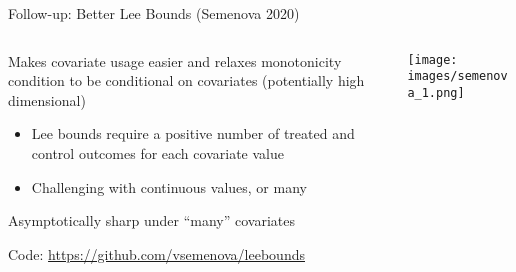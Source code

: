 \documentclass[notes,11pt, aspectratio=169]{beamer}
\newenvironment{wideitemize}{\itemize\addtolength{\itemsep}{10pt}}{\enditemize}
\begin{document}
\begin{frame}{Follow-up: Better Lee Bounds (Semenova 2020)}
      \begin{columns}[onlytextwidth, T] %
        \begin{column}{.5\textwidth}
          \begin{wideitemize}
          \item Makes covariate usage easier and relaxes monotonicity condition to be conditional on
            covariates (potentially high dimensional)
            \begin{itemize}
            \item Lee bounds require a positive number of treated and
              control outcomes for each covariate value
            \item Challenging with continuous values, or many
            \end{itemize}
          \item Asymptotically sharp under ``many'' covariates 
          \item Code: \url{https://github.com/vsemenova/leebounds}
          \end{wideitemize}
      \end{column}%
      \hfill%
      \begin{column}{.5\textwidth}
        \texttt{[image: images/semenova\_1.png]}
      \end{column}%
    \end{columns}
\end{frame}
\end{document}
